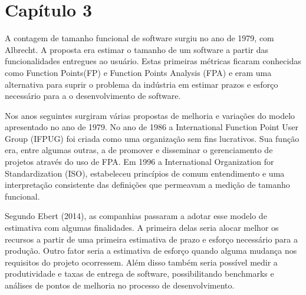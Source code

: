 \chapter*[Capítulo 3]{Capítulo 3}                                                                                                                 

A contagem de tamanho funcional de software surgiu no ano de 1979, com Albrecht.
A proposta era estimar o tamanho de um software a partir das funcionalidades
entregues ao usuário. Estas primeiras métricas ficaram conhecidas como Function
Points(FP) e Function Points Analysis (FPA) e eram uma alternativa para suprir
o problema da indústria em estimar prazos e esforço necessário para a o
desenvolvimento de software.

Nos anos seguintes surgiram várias propostas de melhoria e variações do modelo
apresentado no ano de 1979. No ano de 1986 a International
Function Point User Group (IFPUG) foi criada como uma organização sem fins
lucrativos. Sua função era, entre algumas outras, a de promover e disseminar
o gerenciamento de projetos através do uso de FPA. Em 1996 a International
Organization for Standardization (ISO), estabeleceu princípios de comum
entendimento e uma interpretação consistente das  definições que permeavam a
medição de tamanho funcional.

Segundo Ebert (2014), as companhias passaram a adotar esse modelo de estimativa
com algumas finalidades. A primeira delas seria alocar melhor os recursos a
partir de uma primeira estimativa de prazo e esforço necessário para a produção.
Outro fator seria a estimativa de esforço quando alguma mudança nos requisitos
do projeto ocorressem. Além disso também seria possível medir a produtividade e
taxas de entrega de software, possibilitando benchmarks  e análises de pontos
de melhoria no processo de desenvolvimento.

